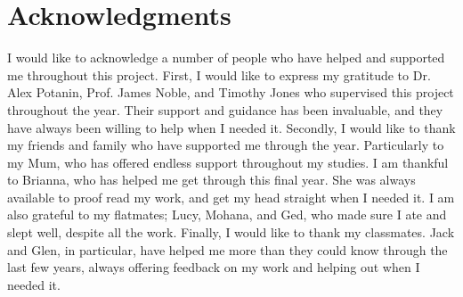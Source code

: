 \chapter*{Acknowledgments}\label{C:ack}
I would like to acknowledge a number of people who have helped and supported me throughout this project.
\newline\newline
First, I would like to express my gratitude to Dr. Alex Potanin, Prof. James Noble, and Timothy Jones who supervised this project throughout the year. Their support and guidance has been invaluable, and they have always been willing to help when I needed it.
\newline\newline
Secondly, I would like to thank my friends and family who have supported me through the year. Particularly to my Mum, who has offered endless support throughout my studies. I am thankful to Brianna, who has helped me get through this final year. She was always available to proof read my work, and get my head straight when I needed it. I am also grateful to my flatmates; Lucy, Mohana, and Ged, who made sure I ate and slept well, despite all the work.
\newline\newline
Finally, I would like to thank my classmates. Jack and Glen, in particular, have helped me more than they could know through the last few years, always offering feedback on my work and helping out when I needed it.